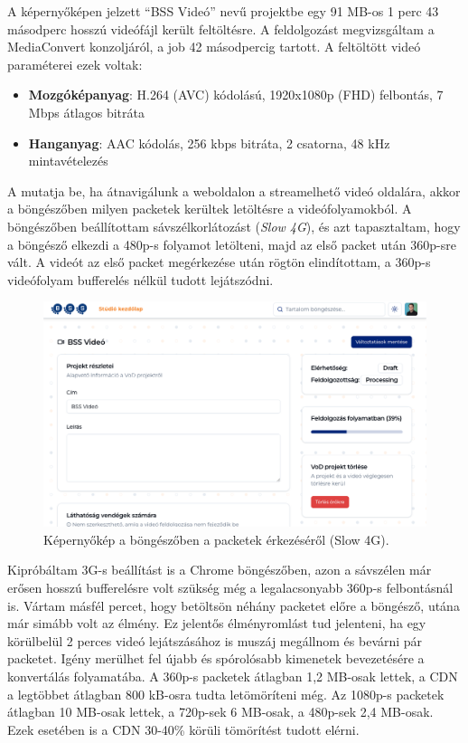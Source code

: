 A képernyőképen jelzett ``BSS Videó'' nevű projektbe egy 91 MB-os 1 perc 43 másodperc hosszú videófájl került feltöltésre. A feldolgozást megvizsgáltam a MediaConvert konzoljáról, a job 42 másodpercig tartott. A feltöltött videó paraméterei ezek voltak:

\begin{itemize}
  \setlength{\itemsep}{1pt}
  \setlength{\parskip}{0pt}
  \setlength{\parsep}{0pt}
  \item \textbf{Mozgóképanyag}: H.264 (AVC) kódolású, 1920x1080p (FHD) felbontás, 7 Mbps átlagos bitráta
  \item \textbf{Hanganyag}: AAC kódolás, 256 kbps bitráta, 2 csatorna, 48 kHz mintavételezés
\end{itemize}

A  mutatja be, ha átnavigálunk a weboldalon a streamelhető videó oldalára, akkor a böngészőben milyen packetek kerültek letöltésre a videófolyamokból. A böngészőben beállítottam sávszélkorlátozást (\emph{Slow 4G}), és azt tapasztaltam, hogy a böngésző elkezdi a 480p-s folyamot letölteni, majd az első packet után 360p-sre vált. A videót az első packet megérkezése után rögtön elindítottam, a 360p-s videófolyam bufferelés nélkül tudott lejátszódni.

\begin{figure}[ht]
  \centering
  \includegraphics[width=150mm, keepaspectratio]{figures/processing.png}
  \caption{Képernyőkép a böngészőben a packetek érkezéséről (Slow 4G).}
  \label{fig:slow4g}
\end{figure}

Kipróbáltam 3G-s beállítást is a Chrome böngészőben, azon a sávszélen már erősen hosszú bufferelésre volt szükség még a legalacsonyabb 360p-s felbontásnál is. Vártam másfél percet, hogy betöltsön néhány packetet előre a böngésző, utána már simább volt az élmény. Ez jelentős élményromlást tud jelenteni, ha egy körülbelül 2 perces videó lejátszásához is muszáj megállnom és bevárni pár packetet. Igény merülhet fel újabb és spórolósabb kimenetek bevezetésére a konvertálás folyamatába.
A 360p-s packetek átlagban 1,2 MB-osak lettek, a CDN a legtöbbet átlagban 800 kB-osra tudta letömöríteni még. Az 1080p-s packetek átlagban 10 MB-osak lettek, a 720p-sek 6 MB-osak, a 480p-sek 2,4 MB-osak. Ezek esetében is a CDN 30-40\% körüli tömörítést tudott elérni.

